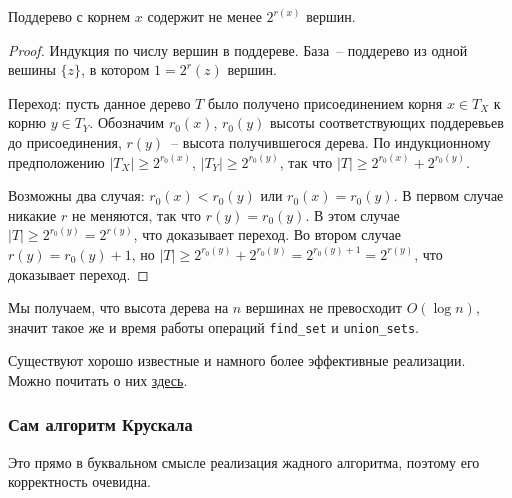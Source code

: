 \begin{lemma*}
    Поддерево с корнем $x$ содержит не менее $2^{r(x)}$ вершин.
\end{lemma*}
\begin{proof}
    Индукция по числу вершин в поддереве. База~-- поддерево из одной вешины $\{z\}$, в котором $1 = 2^r(z)$ вершин.

    Переход: пусть данное дерево $T$ было получено присоединением корня $x \in T_X$ к корню $y \in T_Y$. Обозначим $r_0(x)$, $r_0(y)$ высоты соответствующих поддеревьев до присоединения, $r(y)$~-- высота получившегося дерева. По индукционному предположению $|T_X| \geq 2^{r_0(x)}$, $|T_Y| \geq 2^{r_0(y)}$, так что $|T| \geq 2^{r_0(x)} + 2^{r_0(y)}$.

    Возможны два случая: $r_0(x) < r_0(y)$ или $r_0(x) = r_0(y)$. В первом случае никакие $r$ не меняются, так что $r(y) = r_0(y)$. В этом случае $|T| \geq 2^{r_0(y)} = 2^{r(y)}$, что доказывает переход. Во втором случае $r(y) = r_0(y) + 1$, но $|T| \geq 2^{r_0(y)} + 2^{r_0(y)} = 2^{r_0(y) + 1} = 2^{r(y)}$, что доказывает переход.
\end{proof}

Мы получаем, что высота дерева на $n$ вершинах не превосходит $O(\log n)$, значит такое же и время работы операций {\tt find\_set} и {\tt union\_sets}.

\begin{nb*}
    Существуют хорошо известные и намного более эффективные реализации. Можно почитать о них \href{https://e-maxx.ru/algo/dsu}{здесь}.
\end{nb*}

\subsubsection{Сам алгоритм Крускала}
\begin{algorithm}[H]
	\DontPrintSemicolon
\end{algorithm}
Это прямо в буквальном смысле реализация жадного алгоритма, поэтому его корректность очевидна.

